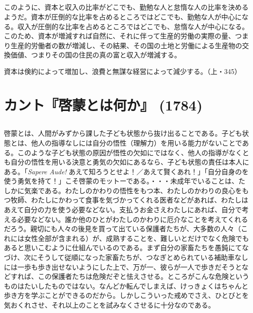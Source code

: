 \subsection{}



このように、資本と収入の比率がどこでも、勤勉な人と怠惰な人の比率を決めるようだ。資本が圧倒的な比率を占めるところではどこでも、勤勉な人が中心になる。収入が圧倒的な比率を占めるところではどこでも、怠惰な人が中心になる。このため、資本が増減すれば自然に、それに伴って生産的労働の実際の量、つまり生産的労働者の数が増減し、その結果、その国の土地と労働による生産物の交換価値、つまりその国の住民の真の富と収入が増減する。

資本は倹約によって増加し、浪費と無謀な経営によって減少する。（上・345）



\section{カント『啓蒙とは何か』 (1784)}


\subsection{}



啓蒙とは、人間がみずから課した子ども状態から抜け出ることである。子ども状態とは、他人の指導なしには自分の悟性（理解力）を用いる能力がないことである。このような子ども状態の原因が悟性の欠如にではなく、他人の指導がなくとも自分の悟性を用いる決意と勇気の欠如にあるなら、子ども状態の責任は本人にある。「\emph{Sapere Aude!} あえて知ろうとせよ！／あえて賢くあれ！」「自分自身のを使う勇気を持て！」こそ啓蒙のモットーである。・・・未成年でいることは、たしかに気楽である。わたしのかわりの悟性をもつ本、わたしのかわりの良心をもつ牧師、わたしにかわって食事を気づかってくれる医者などがあれば、わたしはあえて自分の力を使う必要などない。支払うお金さえわたしにあれば、自分で考える必要などない。誰か他のひとがわたしのかわりに厄介なことを考えてくれるだろう。親切にも人々の後見を買って出ている保護者たちが、大多数の人々（これには女性全部が含まれる）が、成熟することを、難しいとだけでなく危険でもあると思いこむように仕組んでいるのである。まず自分の家畜たちを愚鈍にてなづけ、次にそうして従順になった家畜たちが、つなぎとめられている補助車なしには一歩も歩き出せないようにした上で、万が一、彼らが一人で歩きだそうとなどすれば、この保護者たちは危険だぞと怯えさせる。ところがこんな危険というものはたいしたものではない。なんどか転んでしまえば、けっきょくはちゃんと歩き方を学ぶことができるのだから。しかしこういった戒めでさえ、ひとびとを気おくれさせ、それ以上のことを試みなくさせるに十分なのである。




